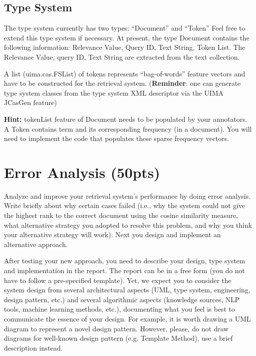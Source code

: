 \documentclass[oneside,11pt]{memoir}
\begin{document}
\section{Type System}\label{SectionType}
The type system currently has two types: ``Document'' and ``Token'' 
Feel free to extend this type system if necessary.
At present, the type Document contains the following information: Relevance Value, Query ID, Text String, Token
List. The Relevance Value, query ID, Text String are extracted from the text collection. 

A list (uima.cas.FSList) of tokens 
represents ``bag-of-words'' feature vectors and have to be constructed for the retrieval system. (\textbf{Reminder}:
one can generate type system classes from the type system XML descriptor via the UIMA JCasGen feature)

\textbf{Hint:} tokenList feature of Document needs to be populated by your annotators. 
A Token contains term and its corresponding frequency (in a document). 
You will need to implement the code that populates these sparse frequency vectors.

\chapter{Error Analysis (50pts)}
\label{SectionError}
Analyze and improve your retrieval system's performance by doing error analysis. Write briefly about
why certain cases failed (i.e., why the system could not give the highest rank to the correct document
using the cosine similarity measure, what alternative strategy you adopted to resolve this problem, and
why you think your alternative strategy will work). Next you design and implement an alternative
approach.

After testing your new approach,
you need to describe your design, type system and implementation in the report.
The report can be in a free form (you do not have to follow a pre-specified template).
Yet, we expect you to consider the system design from several architectural aspects (UML, type
system, engineering, design pattern, etc.) and several algorithmic aspects (knowledge sources, NLP
tools, machine learning methods, etc.), documenting what you feel is best to communicate
the essence of your design. 
For example, it is worth drawing a UML diagram to represent a novel design pattern.
However, please, do not draw diagrams
for well-known design pattern (e.g. Template Method), use a brief description instead.
\end{document}
